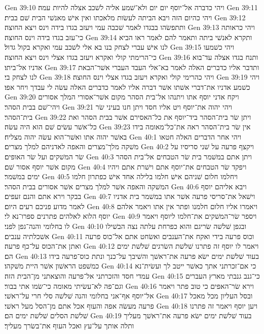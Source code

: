 Gen 39:10  ויהי כדברה אל־יוסף יום יום ולא־שׁמע אליה לשׁכב אצלה להיות עמה׃
Gen 39:11  ויהי כהיום הזה ויבא הביתה לעשׂות מלאכתו ואין אישׁ מאנשׁי הבית שׁם בבית׃
Gen 39:12  ותתפשׂהו בבגדו לאמר שׁכבה עמי ויעזב בגדו בידה וינס ויצא החוצה׃
Gen 39:13  ויהי כראותה כי־עזב בגדו בידה וינס החוצה׃
Gen 39:14  ותקרא לאנשׁי ביתה ותאמר להם לאמר ראו הביא לנו אישׁ עברי לצחק בנו בא אלי לשׁכב עמי ואקרא בקול גדול׃
Gen 39:15  ויהי כשׁמעו כי־הרימתי קולי ואקרא ויעזב בגדו אצלי וינס ויצא החוצה׃
Gen 39:16  ותנח בגדו אצלה עד־בוא אדניו אל־ביתו׃
Gen 39:17  ותדבר אליו כדברים האלה לאמר בא־אלי העבד העברי אשׁר־הבאת לנו לצחק בי׃
Gen 39:18  ויהי כהרימי קולי ואקרא ויעזב בגדו אצלי וינס החוצה׃
Gen 39:19  ויהי כשׁמע אדניו את־דברי אשׁתו אשׁר דברה אליו לאמר כדברים האלה עשׂה לי עבדך ויחר אפו׃
Gen 39:20  ויקח אדני יוסף אתו ויתנהו אל־בית הסהר מקום אשׁר־אסורי המלך אסורים ויהי־שׁם בבית הסהר׃
Gen 39:21  ויהי יהוה את־יוסף ויט אליו חסד ויתן חנו בעיני שׂר בית־הסהר׃
Gen 39:22  ויתן שׂר בית־הסהר ביד־יוסף את כל־האסירם אשׁר בבית הסהר ואת כל־אשׁר עשׂים שׁם הוא היה עשׂה׃
Gen 39:23  אין שׂר בית־הסהר ראה את־כל־מאומה בידו באשׁר יהוה אתו ואשׁר־הוא עשׂה יהוה מצליח׃
Gen 40:1  ויהי אחר הדברים האלה חטאו משׁקה מלך־מצרים והאפה לאדניהם למלך מצרים׃
Gen 40:2  ויקצף פרעה על שׁני סריסיו על שׂר המשׁקים ועל שׂר האופים׃
Gen 40:3  ויתן אתם במשׁמר בית שׂר הטבחים אל־בית הסהר מקום אשׁר יוסף אסור שׁם׃
Gen 40:4  ויפקד שׂר הטבחים את־יוסף אתם וישׁרת אתם ויהיו ימים במשׁמר׃
Gen 40:5  ויחלמו חלום שׁניהם אישׁ חלמו בלילה אחד אישׁ כפתרון חלמו המשׁקה והאפה אשׁר למלך מצרים אשׁר אסורים בבית הסהר׃
Gen 40:6  ויבא אליהם יוסף בבקר וירא אתם והנם זעפים׃
Gen 40:7  וישׁאל את־סריסי פרעה אשׁר אתו במשׁמר בית אדניו לאמר מדוע פניכם רעים היום׃
Gen 40:8  ויאמרו אליו חלום חלמנו ופתר אין אתו ויאמר אלהם יוסף הלוא לאלהים פתרנים ספרו־נא לי׃
Gen 40:9  ויספר שׂר־המשׁקים את־חלמו ליוסף ויאמר לו בחלומי והנה־גפן לפני׃
Gen 40:10  ובגפן שׁלשׁה שׂריגם והוא כפרחת עלתה נצה הבשׁילו אשׁכלתיה ענבים׃
Gen 40:11  וכוס פרעה בידי ואקח את־הענבים ואשׂחט אתם אל־כוס פרעה ואתן את־הכוס על־כף פרעה׃
Gen 40:12  ויאמר לו יוסף זה פתרנו שׁלשׁת השׂרגים שׁלשׁת ימים הם׃
Gen 40:13  בעוד שׁלשׁת ימים ישׂא פרעה את־ראשׁך והשׁיבך על־כנך ונתת כוס־פרעה בידו כמשׁפט הראשׁון אשׁר היית משׁקהו׃
Gen 40:14  כי אם־זכרתני אתך כאשׁר ייטב לך ועשׂית־נא עמדי חסד והזכרתני אל־פרעה והוצאתני מן־הבית הזה׃
Gen 40:15  כי־גנב גנבתי מארץ העברים וגם־פה לא־עשׂיתי מאומה כי־שׂמו אתי בבור׃
Gen 40:16  וירא שׂר־האפים כי טוב פתר ויאמר אל־יוסף אף־אני בחלומי והנה שׁלשׁה סלי חרי על־ראשׁי׃
Gen 40:17  ובסל העליון מכל מאכל פרעה מעשׂה אפה והעוף אכל אתם מן־הסל מעל ראשׁי׃
Gen 40:18  ויען יוסף ויאמר זה פתרנו שׁלשׁת הסלים שׁלשׁת ימים הם׃
Gen 40:19  בעוד שׁלשׁת ימים ישׂא פרעה את־ראשׁך מעליך ותלה אותך על־עץ ואכל העוף את־בשׂרך מעליך׃
